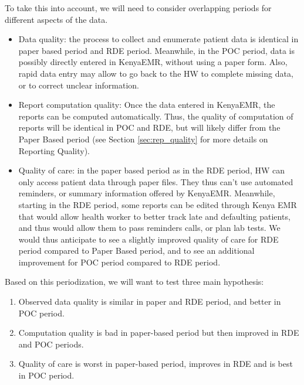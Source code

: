 \documentclass[a4paper,11pt,draft,twoside]{article}
\begin{document}
To take this into account, we will need to consider overlapping periods for different aspects of the data.
\begin{itemize}
\item	Data quality: the process to collect and enumerate patient data is identical in paper based period and RDE period. Meanwhile, in the POC period, data is possibly directly entered in KenyaEMR, without using a paper form. Also, rapid data entry may allow to go back to the HW to complete missing data, or to correct unclear information.
\item	Report computation quality: Once the data entered in KenyaEMR, the reports can be computed automatically. Thus, the quality of computation of reports will be identical in POC and RDE, but will likely differ from the Paper Based period (see Section \ref{sec:rep_quality} for more details on Reporting Quality).
\item	Quality of care: in the paper based period as in the RDE period, HW can only access patient data through paper files. They thus can’t use automated reminders, or summary information offered by KenyaEMR. Meanwhile, starting in the RDE period, some reports can be edited through Kenya EMR that would allow health worker to better track late and defaulting patients, and thus would allow them to pass reminders calls, or plan lab tests. We would thus anticipate to see a slightly improved quality of care for RDE period compared to Paper Based period, and to see an additional improvement for POC period compared to RDE period.
\end{itemize}

Based on this periodization, we will want to test three main hypothesis:
\begin{enumerate}
\item	Observed data quality is similar in paper and RDE period, and better in POC period.
\item	Computation quality is bad in paper-based period but then improved in RDE and POC periods.
\item	Quality of care is worst in paper-based period, improves in RDE and is best in POC period.
\end{enumerate}

\end{document}
